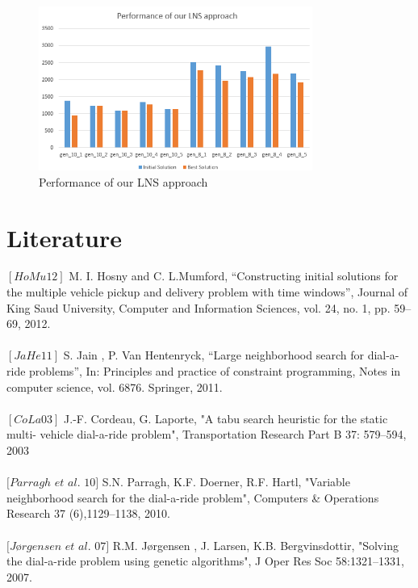 \documentclass[fleqn]{scrartcl}
\begin{document}
\begin{figure}[htbp] 
\centering
\includegraphics[width=0.8\textwidth]{files/performance_lns.png}
\caption{Performance of our LNS approach}
\label{fig:performance}
\end{figure}



\newpage
\section{Literature}
$[HoMu 12]$ M. I. Hosny and C. L.Mumford, “Constructing initial solutions for the multiple vehicle pickup and delivery problem with time windows”, Journal of King Saud University, Computer and Information Sciences, vol. 24, no. 1, pp. 59–69, 2012.
\\
\\
$[JaHe 11]$ S. Jain , P. Van Hentenryck, “Large neighborhood search for dial-a-ride problems”, In: Principles and practice of constraint programming, Notes in computer science, vol. 6876. Springer, 2011.
\\
\\
$[CoLa 03]$ J.-F. Cordeau, G. Laporte, "A tabu search heuristic for the static multi- vehicle dial-a-ride problem", Transportation Research Part B 37: 579–594, 2003
\\
\\
$[Parragh$  $et$  $al.$ $10]$ S.N. Parragh, K.F. Doerner, R.F. Hartl, "Variable neighborhood search for the dial-a-ride problem", Computers \& Operations Research 37 (6),1129–1138, 2010. 
\\
\\
$[Jørgensen$ $et$ $al.$ $07]$ R.M. Jørgensen , J. Larsen, K.B. Bergvinsdottir, "Solving the dial-a-ride problem using genetic algorithms", J Oper Res Soc 58:1321–1331, 2007.
\end{document}
